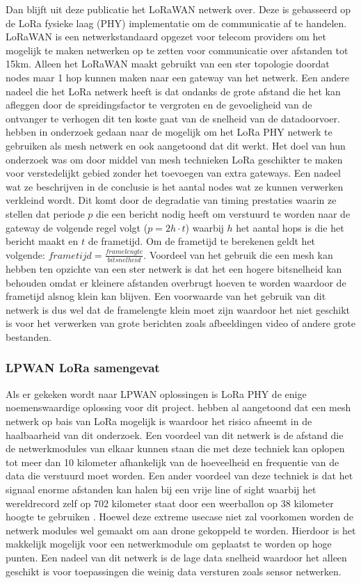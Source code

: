 \documentclass[a4paper, 11pt, oneside]{report}
\begin{document}
Dan blijft uit deze publicatie het LoRaWAN netwerk over. 
Deze is gebasseerd op de LoRa fysieke laag (PHY)\cite{LoRAMOD} implementatie om de communicatie af te handelen.
LoRaWAN is een netwerkstandaard opgezet voor telecom providers om het mogelijk te maken netwerken op te zetten voor communicatie over afstanden tot 15km.
Alleen het LoRaWAN maakt gebruikt van een ster topologie doordat nodes maar 1 hop kunnen maken naar een gateway van het netwerk.
Een andere nadeel die het LoRa netwerk heeft is dat ondanks de grote afstand die het kan afleggen door de spreidingsfactor te vergroten en de gevoeligheid van de ontvanger te verhogen dit ten koste gaat van de snelheid van de datadoorvoer.
 hebben in onderzoek gedaan naar de mogelijk om het LoRa PHY netwerk te gebruiken als mesh netwerk en ook aangetoond dat dit werkt.
Het doel van hun onderzoek was om door middel van mesh technieken LoRa geschikter te maken voor verstedelijkt gebied zonder het toevoegen van extra gateways. 
Een nadeel wat ze beschrijven in de conclusie is het aantal nodes wat ze kunnen verwerken verkleind wordt.
Dit komt door de degradatie van timing prestaties waarin ze stellen dat periode $p$ die een bericht nodig heeft om verstuurd te worden naar de gateway de volgende regel volgt ($p = 2h\cdot t$) waarbij $h$ het aantal hops is die het bericht maakt en $t$ de frametijd. Om de frametijd te berekenen geldt het volgende: $frametijd = \frac{framelengte}{bitsnelheid}$. 
Voordeel van het gebruik die een mesh kan hebben ten opzichte van een ster netwerk is dat het een hogere bitsnelheid kan behouden omdat er kleinere afstanden overbrugt hoeven te worden waardoor de frametijd alsnog klein kan blijven.
Een voorwaarde van het gebruik van dit netwerk is dus wel dat de framelengte klein moet zijn waardoor het niet geschikt is voor het verwerken van grote berichten zoals afbeeldingen video of andere grote bestanden.

\subsubsection*{LPWAN LoRa samengevat}
Als er gekeken wordt naar LPWAN oplossingen is LoRa PHY de enige noemenswaardige oplossing voor dit project.
 hebben al aangetoond dat een mesh netwerk op bais van LoRa mogelijk is waardoor het risico afneemt in de haalbaarheid van dit onderzoek.
Een voordeel van dit netwerk is de afstand die de netwerkmodules van elkaar kunnen staan die met deze techniek kan oplopen tot meer dan 10 kilometer afhankelijk van de hoeveelheid en frequentie van de data die verstuurd moet worden.
Een ander voordeel van deze techniek is dat het signaal enorme afstanden kan halen bij een vrije line of sight waarbij het wereldrecord zelf op 702 kilometer staat door een weerballon op 38 kilometer hoogte te gebruiken \cite{LoRARecord}.
Hoewel deze extreme usecase niet zal voorkomen worden de netwerk modules wel gemaakt om aan drone gekoppeld te worden.
Hierdoor is het makkelijk mogelijk voor een netwerkmodule om geplaatst te worden op hoge punten. 
Een nadeel van dit netwerk is de lage data snelheid waardoor het alleen geschikt is voor toepassingen die weinig data versturen zoals sensor netwerken.
\end{document}
